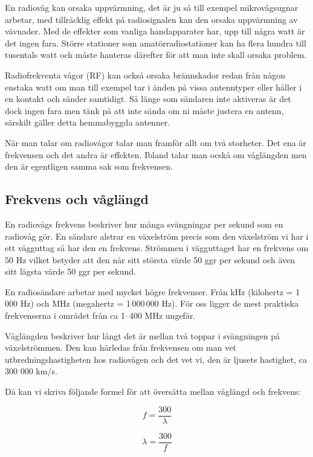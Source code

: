 En radiovåg kan orsaka uppvärmning, det är ju så till exempel mikrovågsugnar arbetar, med tillräcklig effekt på radiosignalen kan den orsaka uppvärmning av vävnader. Med de effekter som vanliga handapparater har, upp till några watt är det ingen fara. Större stationer som amatörradiostationer kan ha flera hundra till tusentals watt och måste hanteras därefter för att man inte skall orsaka problem.

Radiofrekventa vågor (RF) kan också orsaka brännskador redan från någon enstaka watt om man till exempel tar i änden på vissa antenntyper eller håller i en kontakt och sänder samtidigt. Så länge som sändaren inte aktiveras är det dock ingen fara men tänk på att inte sända om ni måste justera en antenn, särskilt gäller detta hemmabyggda antenner.

När man talar om radiovågor talar man framför allt om två storheter. Det ena är frekvensen och det andra är effekten. Ibland talar man ocskå om våglängden men den är egentligen samma sak som frekvensen.

\subsection{Frekvens och våglängd}

En radiovågs frekvens beskriver hur många svängningar per sekund som en radiovåg gör. En sändare alstrar en växelström precis som den växelström vi har i ett vägguttag så har den en frekvens. Strömmen i vägguttaget har en frekvens om 50 Hz vilket betyder att den når sitt största värde 50 ggr per sekund och även sitt lägsta värde 50 ggr per sekund. 

En radiosändare arbetar med mycket högre frekvenser. Från kHz (kilohertz = 1\,000 Hz) och MHz (megahertz = 1\,000\,000 Hz). För oss ligger de mest praktiska frekvenserna i området från ca 1--400 MHz ungefär.

Våglängden beskriver hur långt det är mellan två toppar i svängningen på växelströmmen. Den kan härledas från frekvensen om man vet utbredningshastigheten hos radiovågen och det vet vi, den är ljusets hastighet, ca 300 000 km/s.

Då kan vi skriva följande formel för att översätta mellan våglängd och frekvens:

\begin{equation}
f = \frac{300}{\lambda}
\end{equation}

\begin{equation}
\lambda = \frac{300}{f}
\end{equation}

